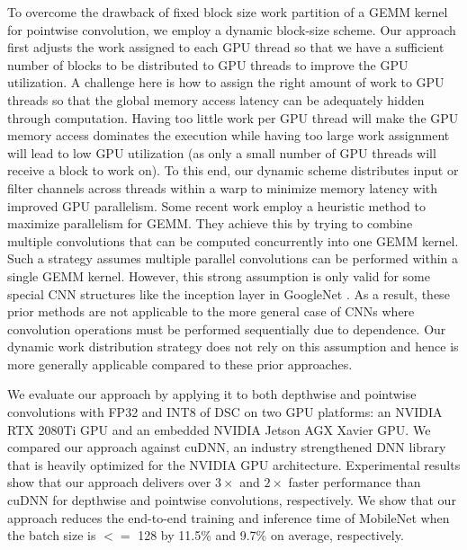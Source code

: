 To overcome the drawback of fixed block size work partition of a GEMM kernel for pointwise convolution, we employ a dynamic block-size
scheme. Our approach first adjusts the work assigned to each GPU thread so that we have a sufficient number of blocks to be distributed to GPU
threads to improve the GPU utilization. A challenge here is how to assign the right amount of work to GPU threads so that the global memory
access latency can be adequately hidden through computation. Having too little work per GPU thread will make the GPU memory access
dominates the execution while having too large work assignment will lead to low GPU utilization (as only a small number of GPU threads will
receive a block to work on). To this end, our dynamic scheme distributes input or filter channels across threads within a warp to minimize
memory latency with improved GPU parallelism. Some recent work \cite{li2019coordinated,pourghassemi2020limits} employ a heuristic method 
to maximize parallelism for GEMM. They achieve this by trying to combine multiple convolutions that can be computed concurrently into one
GEMM kernel. Such a strategy assumes multiple parallel convolutions can be performed within a single GEMM kernel. However, this strong
assumption is only valid for some special CNN structures like the inception layer in GoogleNet \cite{szegedy2015going}. As a result, these
prior methods are not applicable to the more general case of CNNs where convolution operations must be performed sequentially due to
dependence. Our dynamic work distribution strategy does not rely on this assumption and hence is more generally applicable compared to
these prior approaches.

We evaluate our approach by applying it to both depthwise and pointwise convolutions with FP32 and INT8 of DSC on two GPU platforms: an NVIDIA RTX 2080Ti GPU
and an embedded NVIDIA Jetson AGX Xavier GPU. We compared our approach against cuDNN, an industry strengthened DNN library that is heavily
optimized for the NVIDIA GPU architecture. Experimental results show that our approach delivers over $3\times$ and $2\times$ faster
performance than cuDNN for depthwise and pointwise convolutions, respectively. We show that our approach reduces the end-to-end training
and inference time of MobileNet \cite{Sandler_2018_CVPR,howard2019searching} when the batch size is $<=$ 128 by 11.5\% and 9.7\% on average, respectively.



